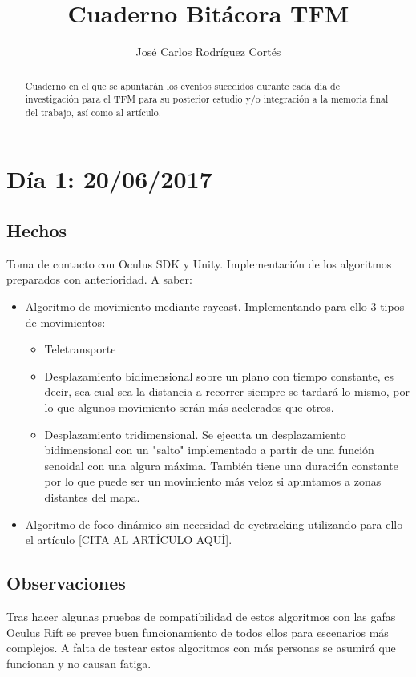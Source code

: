 \documentclass[12pt,a4paper]{article}
\author{José Carlos Rodríguez Cortés}
\title{Cuaderno Bitácora TFM}
\begin{document}
\maketitle
\begin{abstract}
Cuaderno en el que se apuntarán los eventos sucedidos durante cada día de investigación para el TFM para su posterior estudio y/o integración a la memoria final del trabajo, así como al artículo.
\end{abstract}
\break

\section{Día 1: 20/06/2017}

\subsection{Hechos}

Toma de contacto con Oculus SDK y Unity.
Implementación de los algoritmos preparados con anterioridad. A saber:

\begin{itemize}
\item Algoritmo de movimiento mediante raycast. Implementando para ello 3 tipos de movimientos:
	\begin{itemize}
	\item Teletransporte
	\item Desplazamiento bidimensional sobre un plano con tiempo constante, es decir, sea cual sea la distancia a recorrer siempre se tardará lo mismo, por lo que algunos movimiento serán más acelerados que otros.
	\item Desplazamiento tridimensional. Se ejecuta un desplazamiento bidimensional con un "salto" implementado a partir de una función senoidal con una algura máxima. También tiene una duración constante por lo que puede ser un movimiento más veloz si apuntamos a zonas distantes del mapa.
	\end{itemize}
\item Algoritmo de foco dinámico sin necesidad de eyetracking utilizando para ello el artículo [CITA AL ARTÍCULO AQUÍ].
\end{itemize}

\subsection{Observaciones}

Tras hacer algunas pruebas de compatibilidad de estos algoritmos con las gafas Oculus Rift se prevee buen funcionamiento de todos ellos para escenarios más complejos. A falta de testear estos algoritmos con más personas se asumirá que funcionan y no causan fatiga.
\end{document}

